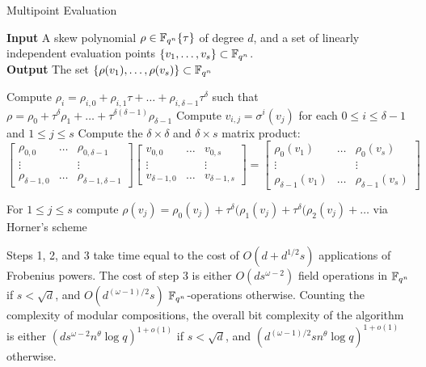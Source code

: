\begin{algorithm}
\caption{Multipoint Evaluation \cite{musschost}}
\label{alg:mpe2}
\hspace*{\algorithmicindent} \textbf{Input} A skew polynomial $\rho \in \mathbb{F}_{q^n}\{\tau \}$ of degree $d$, and a set of linearly independent evaluation points $\{ v_1, \ldots, v_s \} \subset \mathbb{F}_{q^n}$.\\
 \hspace*{\algorithmicindent} \textbf{Output} The set $\{ \rho(v_1), \ldots, \rho(v_s) \} \subset  \mathbb{F}_{q^n}$ \\
 \begin{algorithmic}[1]
  \State Compute $\rho_i = \rho_{i,0} + \rho_{i,1}\tau + \ldots + \rho_{i,\delta - 1} \tau^{\delta}$ such that $\rho = \rho_0 + \tau^{\delta} \rho_1 + \ldots + \tau^{\delta(\delta - 1)}\rho_{\delta-1}$
  \State Compute $v_{i,j} = \sigma^i(v_j)$ for each $0 \leq i \leq \delta-1$ and $1 \leq j \leq s$
  \State Compute the $\delta \times \delta$ and $\delta \times s$ matrix product:
  $
  \begin{bmatrix}
  \rho_{0,0} & \ldots & \rho_{0, \delta - 1} \\ 
  \vdots & & \vdots \\
  \rho_{\delta - 1, 0} & \ldots & \rho_{\delta - 1, \delta - 1}
  \end{bmatrix}\begin{bmatrix}
  v_{0,0}  & \ldots & v_{0,s} \\ \vdots & & \vdots \\
  v_{\delta - 1, 0} & \ldots & v_{\delta - 1, s}
  \end{bmatrix} = \begin{bmatrix}
  \rho_0(v_1) & \ldots & \rho_{0}(v_s) \\ 
  \vdots & & \vdots \\
  \rho_{\delta - 1}(v_1) & \ldots & \rho_{\delta - 1}(v_s)
  \end{bmatrix}
  $
  
  \State For $1 \leq j \leq s$ compute $\rho(v_j) = \rho_0(v_j) + \tau^{\delta}(\rho_1(v_j) + \tau^{\delta}(\rho_2(v_j) + \ldots $ via Horner's scheme
 
\end{algorithmic}

\end{algorithm}

Steps 1, 2, and 3 take time equal to the cost of $O(d + d^{1/2}s )$ applications of Frobenius powers. The cost of step 3 is either $O(ds^{\omega - 2})$ field operations in $\mathbb{F}_{q^n}$ if $s < \sqrt{d}$, and $O(d^{(\omega-1)/2}s)$ $\mathbb{F}_{q^n}$-operations otherwise.  Counting the complexity of modular compositions, the overall bit complexity of the algorithm is either $(ds^{\omega - 2} n^{\theta} \log q)^{1 + o(1)}$ if $s < \sqrt{d}$, and $(d^{(\omega-1)/2}sn^{\theta} \log q)^{1 + o(1)}$ otherwise.

